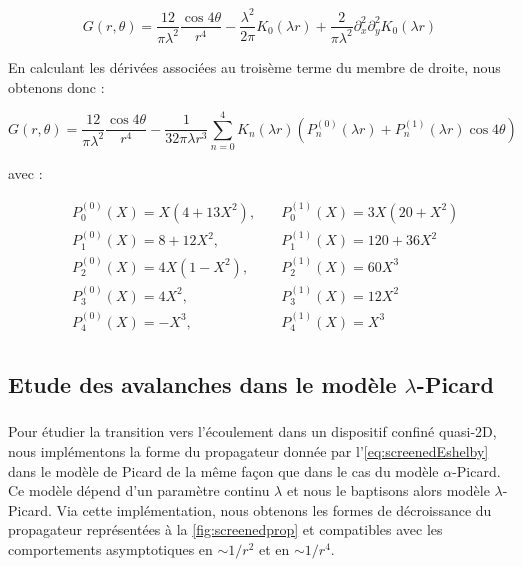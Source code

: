 \begin{equation}
    G(r,\theta) = \frac{12}{\pi\lambda^2}\frac{\cos 4\theta}{r^4}-\frac{\lambda^2}{2\pi}K_0(\lambda r)+\frac{2}{\pi\lambda^2}\partial_x^2\partial_y^2K_0(\lambda r)
\end{equation}

\noindent En calculant les dérivées associées au troisème terme du membre de droite, nous obtenons donc :

\begin{equation}
    G(r,\theta) = \frac{12}{\pi\lambda^2}\frac{\cos 4\theta}{r^4} - \frac{1}{32\pi\lambda r^3}\sum_{n=0}^{4}K_n(\lambda r)\left(P_n^{(0)}(\lambda r) + P_n^{(1)}(\lambda r)\cos 4\theta\right)
\end{equation}

\noindent avec :

\begin{equation}
    \begin{aligned}
        &P_0^{(0)}(X) = X(4+13X^2), \quad &P_0^{(1)}(X) = 3X(20+X^2)\\
        &P_1^{(0)}(X) = 8+12X^2,\quad &P_1^{(1)}(X) = 120+36X^2\\
        &P_2^{(0)}(X) = 4X(1-X^2),\quad &P_2^{(1)}(X) = 60X^3\\
        &P_3^{(0)}(X) = 4X^2,\quad &P_3^{(1)}(X) = 12X^2\\
        &P_4^{(0)}(X) = -X^3,\quad &P_4^{(1)}(X) = X^3\\
    \end{aligned}
\end{equation}

\subsection{Etude des avalanches dans le modèle $\lambda$-Picard}

\label{sec:screenedav}

\subparagraph{}Pour étudier la transition vers l'écoulement dans un dispositif confiné quasi-2D, nous implémentons la forme du propagateur donnée par l'\autoref{eq:screenedEshelby} dans le modèle de Picard de la même façon que dans le cas du modèle $\alpha$-Picard. Ce modèle dépend d'un paramètre continu $\lambda$ et nous le baptisons alors modèle $\lambda$-Picard. Via cette implémentation, nous obtenons les formes de décroissance du propagateur représentées à la \autoref{fig:screenedprop} et compatibles avec les comportements asymptotiques en $\sim 1/r^2$ et en $\sim 1/r^4$.

